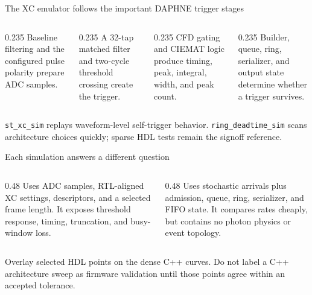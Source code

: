 \documentclass[aspectratio=169,11pt]{beamer}
\begin{document}
\begin{frame}{The XC emulator follows the important DAPHNE trigger stages}
  \begin{columns}[T,onlytextwidth]
    \begin{column}{0.235\textwidth}
        {Baseline filtering and the configured pulse polarity prepare ADC samples.}
    \end{column}
    \begin{column}{0.235\textwidth}
        {A 32-tap matched filter and two-cycle threshold crossing create the trigger.}
    \end{column}
    \begin{column}{0.235\textwidth}
        {CFD gating and CIEMAT logic produce timing, peak, integral, width, and peak count.}
    \end{column}
    \begin{column}{0.235\textwidth}
        {Builder, queue, ring, serializer, and output state determine whether a trigger survives.}
    \end{column}
  \end{columns}

  \smallskip
    {\texttt{st\_xc\_sim} replays waveform-level self-trigger behavior. \texttt{ring\_deadtime\_sim} scans architecture choices quickly; sparse HDL tests remain the signoff reference.}
\end{frame}

\begin{frame}{Each simulation answers a different question}
  \begin{columns}[T,onlytextwidth]
    \begin{column}{0.48\textwidth}
        {Uses ADC samples, RTL-aligned XC settings, descriptors, and a selected frame length. It exposes threshold response, timing, truncation, and busy-window loss.}
    \end{column}
    \begin{column}{0.48\textwidth}
        {Uses stochastic arrivals plus admission, queue, ring, serializer, and FIFO state. It compares rates cheaply, but contains no photon physics or event topology.}
    \end{column}
  \end{columns}

  \smallskip
    {Overlay selected HDL points on the dense C++ curves. Do not label a C++ architecture sweep as firmware validation until those points agree within an accepted tolerance.}
\end{frame}
\end{document}
